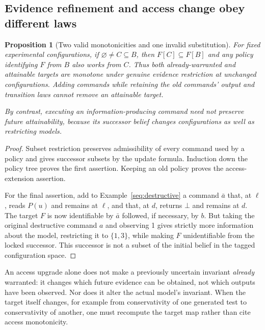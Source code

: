 \documentclass[11pt]{article}
\newtheorem{proposition}[theorem]{Proposition}
\theoremstyle{definition}
\begin{document}
\subsection{Evidence refinement and access change obey different laws}

\begin{proposition}[Two valid monotonicities and one invalid substitution]
\label{seq:monotonicities}
For fixed experimental configurations, if $\varnothing\ne C\subseteq B$,
then $F[C]\subseteq F[B]$ and any policy identifying $F$ from $B$ also
works from $C$. Thus both already-warranted and attainable targets are
monotone under genuine evidence restriction at unchanged configurations.
Adding commands while retaining the old commands' output and transition
laws cannot remove an attainable target.

By contrast, executing an information-producing command need not preserve
future attainability, because its successor belief changes configurations
as well as restricting models.
\end{proposition}
\begin{proof}
Subset restriction preserves admissibility of every command used by a
policy and gives successor subsets by the update formula. Induction down
the policy tree proves the first assertion. Keeping an old policy proves
the access-extension assertion.

For the final assertion, add to Example~\ref{seq:destructive} a command
$\bar a$ that, at $\ell$, reads $P(u)$ and remains at $\ell$, and
that, at $d$, returns $\bot$ and remains at $d$. The target $F$
is now identifiable by $\bar a$ followed, if necessary, by $b$. But taking
the original destructive command $a$ and observing 1 gives strictly more
information about the model, restricting it to $\{1,3\}$, while making
$F$ unidentifiable from the locked successor. This successor is not a
subset of the initial belief in the tagged configuration space.
\end{proof}

An access upgrade alone does not make a previously uncertain invariant
\emph{already} warranted: it changes which future evidence can be obtained,
not which outputs have been observed. Nor does it alter the actual
model's invariant. When the target itself changes, for example from
conservativity of one generated test to conservativity of another, one
must recompute the target map rather than cite access monotonicity.
\end{document}
